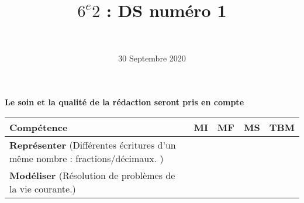 \documentclass[a4paper,11pt]{exam}
\author{\ }
\date{30 Septembre 2020}
\title{$6^e 2$ : DS num\'ero 1}
\begin{document}
%	

	\maketitle
	
\begin{center}
	\textbf{Le soin et la qualité de la rédaction seront pris en compte}
\end{center}

\begin{small}
	\begin{center}
		\begin{tabular}{|@{\ }l@{\ }|@{\ }c@{\ }|@{\ }c@{\ }|@{\ }c@{\ }|@{\ }c@{\ }|}
			\hline
			\textbf{Compétence} & \textbf{MI} & \textbf{MF} & \textbf{MS} & \textbf{TBM} \\
			\hline
			\textbf{Représenter} (Différentes écritures d'un même nombre : fractions/décimaux. ) &  \ \ & \ \ & \ \ & \ \  \\
			\hline	
			\textbf{Modéliser} (Résolution de problèmes de la vie courante.) & \ \ & \ \ &  \ \  & \ \ \\
			\hline
		\end{tabular}
	\end{center}
\end{small}	

	
	
	















%

%
\label{LastPage}

%
\end{document}
